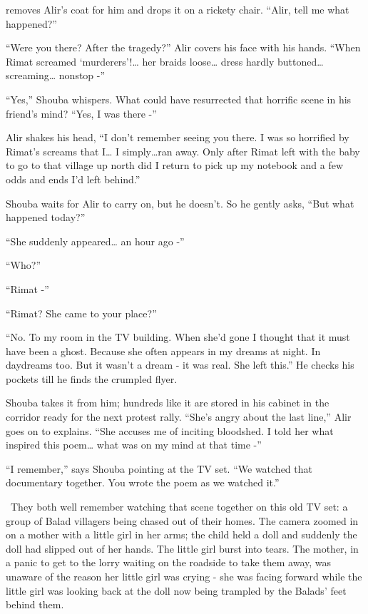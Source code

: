 \documentclass[twoside,11pt]{book}
\begin{document}
removes Alir's coat for him and drops it on a rickety chair. ``Alir, tell me what
happened?''

``Were you there? After the tragedy?'' Alir covers his face with his hands.
``When Rimat screamed `murderers'!{\ldots} her braids loose{\dots} dress hardly buttoned{\ldots} screaming{\dots}
nonstop -''

``Yes,'' Shouba whispers. What could have resurrected that horrific scene in his friend's
mind? ``Yes, I was there -''

Alir shakes his head, ``I don't remember seeing you there. I was so horrified by Rimat's
screams that I{\ldots} I simply{\dots}ran away. Only after Rimat left with the baby to go to that village up north did I
return to pick up my notebook and a few odds and ends I'd left behind.''

Shouba waits for Alir to carry on, but he doesn't. So he gently asks, ``But what happened
today?''

``She suddenly appeared{\dots} an hour ago -''

``Who?''

``Rimat -''

``Rimat? She came to your place?''

``No. To my room in the TV building. When she'd gone I thought that it must have been a ghost. Because she
often appears in my dreams at night. In daydreams too. But it wasn't a dream - it was real. She left
this.'' He checks his pockets till he finds the crumpled flyer.

Shouba takes it from him; hundreds like it are stored in his cabinet in the corridor ready for the next protest rally.
``She's angry about the last line,'' Alir goes on to explains. ``She accuses me
of inciting bloodshed. I told her what inspired this poem{\dots} what was on my mind at that time -''

``I remember,'' says Shouba pointing at the TV set. ``We watched that documentary
together. You wrote the poem as we watched it.''

\ They both well remember watching that scene together on this old TV set: a group of Balad villagers being chased out
of their homes. The camera zoomed in on a mother with a little girl in her arms; the child held a doll and suddenly the
doll had slipped out of her hands. The little girl burst into tears. The mother, in a panic to get to the lorry waiting
on the roadside to take them away, was unaware of the reason her little girl was crying - she was facing forward while
the little girl was looking back at the doll now being trampled by the Balads' feet behind them.
\end{document}
